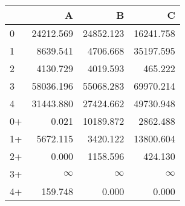 \begin{tabular}{lrrr}
\toprule
     &         A &         B &         C \\
\midrule
 0   & \num{24212.569} & \num{24852.123} & \num{16241.758} \\
 1   &  \num{8639.541} &  \num{4706.668} & \num{35197.595} \\
 2   &  \num{4130.729} &  \num{4019.593} &   \num{465.222} \\
 3   & \num{58036.196} & \num{55068.283} & \num{69970.214} \\
 4   & \num{31443.880} & \num{27424.662} & \num{49730.948} \\
 0+  &     \num{0.021} & \num{10189.872} &  \num{2862.488} \\
 1+  &  \num{5672.115} &  \num{3420.122} & \num{13800.604} \\
 2+  &     \num{0.000} &  \num{1158.596} &   \num{424.130} \\
 3+  &  $\infty$    &  $\infty$    &  $\infty$    \\
 4+  &   \num{159.748} &     \num{0.000} &     \num{0.000} \\
\bottomrule
\end{tabular}